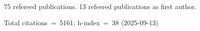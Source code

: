 75 refereed publications. 13 refeered publications as first author.

Total citations~=~5161; h-index~=~38 (2025-09-13)